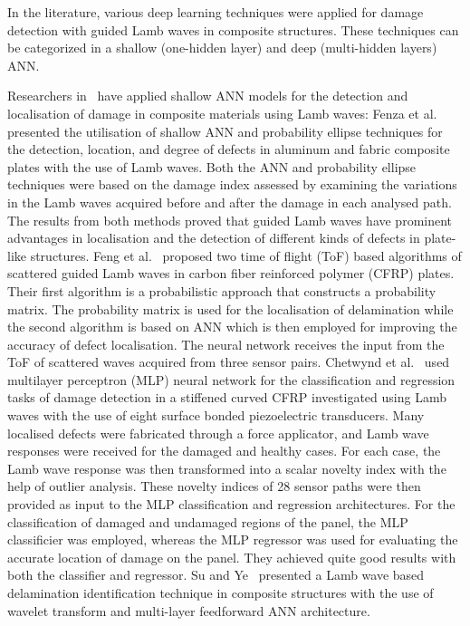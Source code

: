 In the literature, various deep learning techniques were applied for damage detection with guided Lamb waves in composite structures.
These techniques can be categorized in a shallow (one-hidden layer) and deep (multi-hidden layers) ANN.

Researchers in~\cite{de2015application, feng2019locating,chetwynd2008damage} have applied shallow ANN models for the detection and localisation of damage in composite materials using Lamb waves:
Fenza et al.~\cite{de2015application} presented the utilisation of shallow ANN and probability ellipse techniques for the detection, location, and degree of defects in aluminum and fabric composite plates with the use of Lamb waves. 
Both the ANN and probability ellipse techniques were based on the damage index assessed by examining the variations in the Lamb waves acquired before and after the damage in each analysed path. 
The results from both methods proved that guided Lamb waves have prominent advantages in localisation and the detection of different kinds of defects in plate-like structures. 
Feng et al.~\cite{feng2019locating} proposed two time of flight (ToF) based algorithms of scattered guided Lamb waves in carbon fiber reinforced polymer (CFRP) plates. 
Their first algorithm is a probabilistic approach that constructs a probability matrix. The probability matrix is used for the localisation of delamination while the second algorithm is based on ANN which is then employed for improving the accuracy of defect localisation. 
The neural network receives the input from the ToF of scattered waves acquired from three sensor pairs.
Chetwynd et al.~\cite{chetwynd2008damage} used multilayer perceptron (MLP) neural network for the classification and regression tasks of damage detection in a stiffened curved CFRP investigated using Lamb waves with the use of eight surface bonded piezoelectric transducers. 
Many localised defects were fabricated through a force applicator, and Lamb wave responses were received for the damaged and healthy cases. 
For each case, the Lamb wave response was then transformed into a scalar novelty index with the help of outlier analysis. 
These novelty indices of 28 sensor paths were then provided as input to the MLP classification and regression architectures. 
For the classification of damaged and undamaged regions of the panel, the MLP classificier was employed, whereas the MLP regressor was used for evaluating the accurate location of damage on the panel. 
They achieved quite good results with both the classifier and regressor. 
Su and Ye~\cite{su2004lamb} presented a Lamb wave based delamination identification technique in composite structures with the use of wavelet transform and multi-layer feedforward ANN architecture. 
